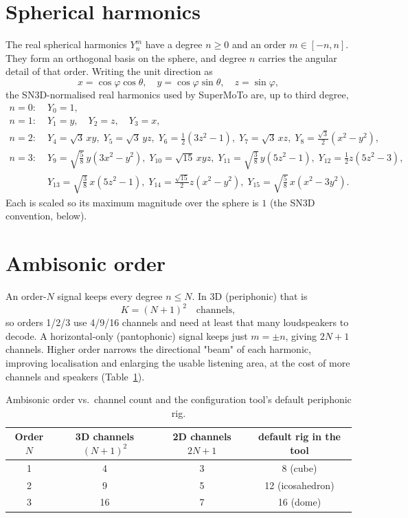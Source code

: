 \section{Spherical harmonics}
The real spherical harmonics \(Y_n^m\) have a degree \(n\ge 0\) and an order \(m\in[-n,n]\). They form an orthogonal basis on the sphere, and degree \(n\) carries the angular detail of that order. Writing the unit direction as
\begin{equation}
  x=\cos\varphi\cos\theta,\quad y=\cos\varphi\sin\theta,\quad z=\sin\varphi,
\end{equation}
the SN3D-normalised real harmonics used by SuperMoTo are, up to third degree,
\begin{align*}
  n=0:\;& Y_0 = 1,\\
  n=1:\;& Y_1 = y,\quad Y_2 = z,\quad Y_3 = x,\\
  n=2:\;& Y_4=\sqrt{3}\,xy,\; Y_5=\sqrt{3}\,yz,\; Y_6=\tfrac12(3z^2-1),\;
          Y_7=\sqrt{3}\,xz,\; Y_8=\tfrac{\sqrt3}{2}(x^2-y^2),\\
  n=3:\;& Y_9=\sqrt{\tfrac58}\,y(3x^2-y^2),\; Y_{10}=\sqrt{15}\,xyz,\;
          Y_{11}=\sqrt{\tfrac38}\,y(5z^2-1),\; Y_{12}=\tfrac12 z(5z^2-3),\\
        & Y_{13}=\sqrt{\tfrac38}\,x(5z^2-1),\; Y_{14}=\tfrac{\sqrt{15}}{2}z(x^2-y^2),\;
          Y_{15}=\sqrt{\tfrac58}\,x(x^2-3y^2).
\end{align*}
Each is scaled so its maximum magnitude over the sphere is \(1\) (the SN3D convention, below).

\section{Ambisonic order}
An order-\(N\) signal keeps every degree \(n\le N\). In 3D (periphonic) that is
\begin{equation}
  K = (N+1)^2 \quad\text{channels},
\end{equation}
so orders 1/2/3 use 4/9/16 channels and need at least that many loudspeakers to decode. A horizontal-only (pantophonic) signal keeps just \(m=\pm n\), giving \(2N+1\) channels. Higher order narrows the directional "beam" of each harmonic, improving localisation and enlarging the usable listening area, at the cost of more channels and speakers (Table~\ref{tab:ambiorder}).

\begin{table}[ht]
\centering
\renewcommand{\arraystretch}{1.2}
\begin{tabular}{cccc}
\toprule
Order \(N\) & 3D channels \((N+1)^2\) & 2D channels \(2N+1\) & default rig in the tool\\
\midrule
1 & 4  & 3 & 8 (cube)\\
2 & 9  & 5 & 12 (icosahedron)\\
3 & 16 & 7 & 16 (dome)\\
\bottomrule
\end{tabular}
\caption{Ambisonic order vs.\ channel count and the configuration tool's default
periphonic rig.}
\label{tab:ambiorder}
\end{table}

